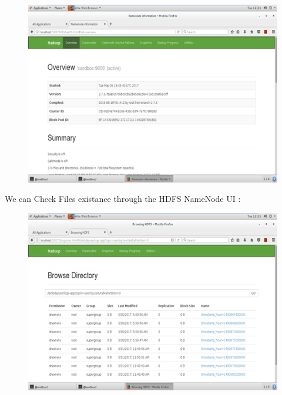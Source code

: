 \begin{figure}[h!]
	\centering
	\includegraphics[height=0.3\textheight]{fig01/HDFSNameNode}
	\label{fig:FilialesEtClients}
\end{figure}
\newline
We can Check Files existance through the HDFS NameNode UI :\\
\begin{figure}[h!]
	\centering
	\includegraphics[height=0.3\textheight]{fig01/BrowserFilesHDFS}
	\label{fig:FilialesEtClients}
\end{figure}
